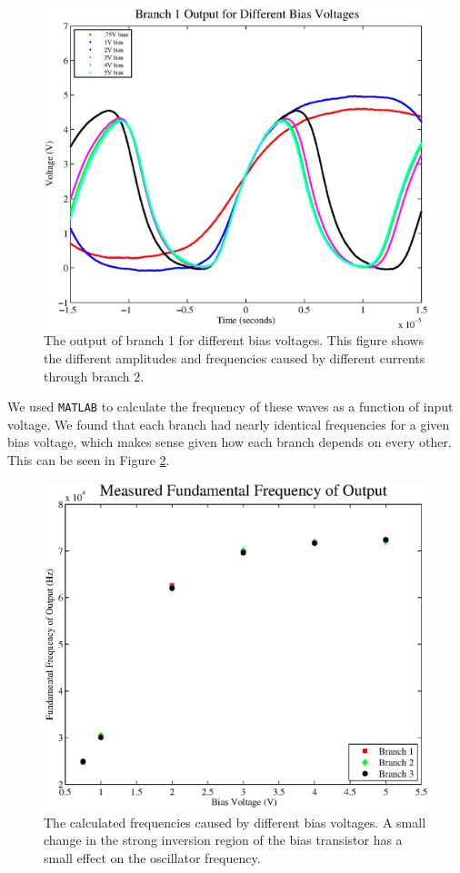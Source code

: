 \documentclass{article}
\begin{document}
\begin{figure}[H]
\centering
\includegraphics[scale=.6]{b1_out.eps}
\caption{The output of branch 1 for different bias voltages. This figure shows the different amplitudes and frequencies caused by different currents through branch 2.}
\label{branch}
\end{figure}

We used \texttt{MATLAB} to calculate the frequency of these waves as a function of input voltage.  We found that each branch had nearly identical frequencies for a given bias voltage, which makes sense given how each branch depends on every other.  This can be seen in Figure \ref{freqs}.

\begin{figure}[H]
\centering
\includegraphics[scale=.5]{freqs.eps}
\caption{The calculated frequencies caused by different bias voltages. A small change in the strong inversion region of the bias transistor has a small effect on the oscillator frequency.}
\label{freqs}
\end{figure}
\end{document}
